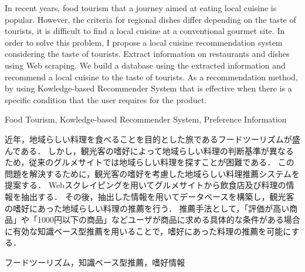 \documentclass{funthesis}
\begin{document}
\maketitle       %

\begin{eabstract}
In recent years, food tourism that a journey aimed at eating local cuisine is popular.
However, the criteria for regional dishes differ depending on the taste of tourists, it is difficult to find a local cuisine at a conventional gourmet site.
In order to solve this problem, I propose a local cuisine recommendation system considering the taste of tourists.
Extract information on restaurants and dishes using Web scraping.
We build a database using the extracted information and recommend a local cuisine to the taste of tourists.
As a recommendation method, by using Kowledge-based Recommender System that is effective when there is a specific condition that the user requires for the product.
\end{eabstract}

\begin{ekeyword}
Food Tourism, Kowledge-based Recommender System, Preference Information
\end{ekeyword}

\begin{jabstract}
近年，地域らしい料理を食べることを目的とした旅であるフードツーリズムが盛んである．
しかし，観光客の嗜好によって地域らしい料理の判断基準が異なるため，従来のグルメサイトでは地域らしい料理を探すことが困難である．
この問題を解決するために，観光客の嗜好を考慮した地域らしい料理推薦システムを提案する．
Webスクレイピングを用いてグルメサイトから飲食店及び料理の情報を抽出する．
その後，抽出した情報を用いてデータベースを構築し，観光客の嗜好にあった地域らしい料理の推薦を行う．
推薦手法として，「評価が高い商品」や「1000円以下の商品」などユーザが商品に求める具体的な条件がある場合に有効な知識ベース型推薦を用いることで，嗜好にあった料理の推薦を可能にする．
\end{jabstract}

\begin{jkeyword}
フードツーリズム，知識ベース型推薦，嗜好情報
\end{jkeyword}
\end{document}
